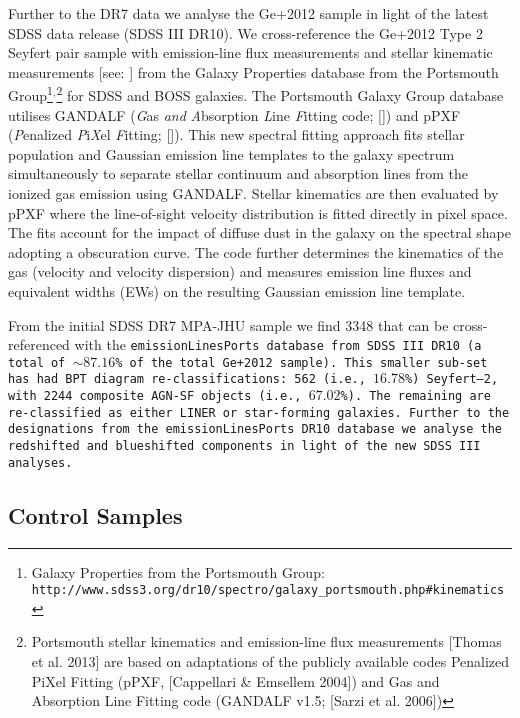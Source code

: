 Further to the DR7 data we analyse the Ge+2012 sample in light of the latest SDSS data release (SDSS III DR10). We cross-reference the Ge+2012 Type 2 Seyfert pair sample with emission-line flux measurements and stellar kinematic measurements [see: \cite{Thomas_2013}] from the Galaxy Properties database from the Portsmouth Group\footnote{\tiny{Galaxy Properties from the Portsmouth Group: \tt{http://www.sdss3.org/dr10/spectro/galaxy_portsmouth.php#kinematics}}}$^{\text{,}}$\footnote{\tiny{Portsmouth stellar kinematics and emission-line flux measurements [Thomas et al. 2013] are based on adaptations of the publicly available codes Penalized PiXel Fitting (pPXF, [Cappellari \& Emsellem 2004]) and Gas and Absorption Line Fitting code (GANDALF v1.5; [Sarzi et al. 2006])}} for SDSS and BOSS galaxies. The Portsmouth Galaxy Group database utilises GANDALF (\textit{G}as \textit{and} \textit{A}bsorption \textit{L}ine \textit{F}itting code; [\cite{Sarzi_2006}]) and pPXF (\textit{P}enalized \textit{P}i\textit{X}el \textit{F}itting; [\cite{2012ascl.soft10002C}]). This new spectral fitting approach fits stellar population and Gaussian emission line templates to the galaxy spectrum simultaneously to separate stellar continuum and absorption lines from the ionized gas emission using GANDALF. Stellar kinematics are then evaluated by pPXF where the line-of-sight velocity distribution is fitted directly in pixel space. The fits account for the impact of diffuse dust in the galaxy on the spectral shape adopting a \cite{Calzetti_2001} obscuration curve. The code further determines the kinematics of the gas (velocity and velocity dispersion) and measures emission line fluxes and equivalent widths (EWs) on the resulting Gaussian emission line template.

From the initial SDSS DR7 MPA-JHU sample we find 3348 that can be cross-referenced with the \tt{emissionLinesPorts} database from SDSS III DR10 (a total of $\sim{87.16}$\% of the total Ge+2012 sample). This smaller sub-set has had BPT diagram re-classifications: 562 (i.e., $16.78$\%) Seyfert--2, with 2244 composite AGN-SF objects (i.e., $67.02$\%). The remaining are re-classified as either LINER or star-forming galaxies. Further to the designations from the \tt{emissionLinesPorts} DR10 database we analyse the redshifted and blueshifted components in light of the new SDSS III analyses.

\subsection{Control Samples}

